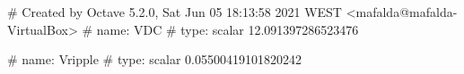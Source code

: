 # Created by Octave 5.2.0, Sat Jun 05 18:13:58 2021 WEST <mafalda@mafalda-VirtualBox>
# name: VDC
# type: scalar
12.091397286523476


# name: Vripple
# type: scalar
0.05500419101820242


